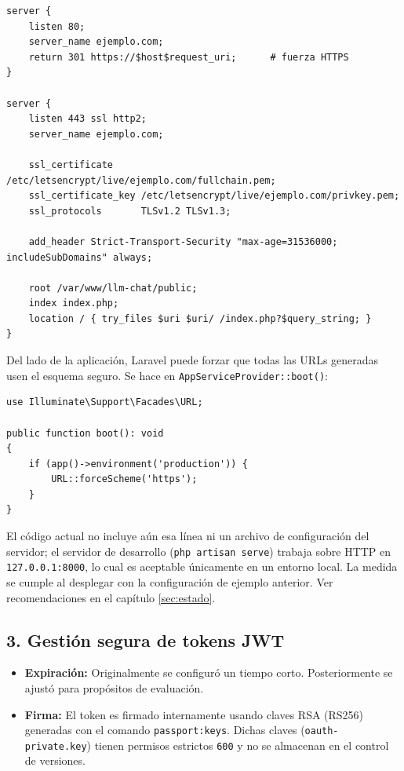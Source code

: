 \begin{lstlisting}[language={}, caption={Ejemplo de configuración Nginx: redirección a HTTPS y HSTS}]
server {
    listen 80;
    server_name ejemplo.com;
    return 301 https://$host$request_uri;      # fuerza HTTPS
}

server {
    listen 443 ssl http2;
    server_name ejemplo.com;

    ssl_certificate     /etc/letsencrypt/live/ejemplo.com/fullchain.pem;
    ssl_certificate_key /etc/letsencrypt/live/ejemplo.com/privkey.pem;
    ssl_protocols       TLSv1.2 TLSv1.3;

    add_header Strict-Transport-Security "max-age=31536000; includeSubDomains" always;

    root /var/www/llm-chat/public;
    index index.php;
    location / { try_files $uri $uri/ /index.php?$query_string; }
}
\end{lstlisting}

Del lado de la aplicación, Laravel puede forzar que todas las URLs generadas usen el esquema seguro. Se hace en \texttt{AppServiceProvider::boot()}:
\begin{lstlisting}[caption={Forzar esquema https en producción (a agregar en AppServiceProvider::boot)}]
use Illuminate\Support\Facades\URL;

public function boot(): void
{
    if (app()->environment('production')) {
        URL::forceScheme('https');
    }
}
\end{lstlisting}

\begin{aviso}
El código actual no incluye aún esa línea ni un archivo de configuración del servidor; el servidor de desarrollo (\texttt{php artisan serve}) trabaja sobre HTTP en \texttt{127.0.0.1:8000}, lo cual es aceptable únicamente en un entorno local. La medida se cumple al desplegar con la configuración de ejemplo anterior. Ver recomendaciones en el capítulo \ref{sec:estado}.
\end{aviso}

\subsection{3. Gestión segura de tokens JWT}
\begin{itemize}
    \item \textbf{Expiración:} Originalmente se configuró un tiempo corto. Posteriormente se ajustó para propósitos de evaluación.
    \item \textbf{Firma:} El token es firmado internamente usando claves RSA (RS256) generadas con el comando \texttt{passport:keys}. Dichas claves (\texttt{oauth-private.key}) tienen permisos estrictos \texttt{600} y no se almacenan en el control de versiones.
\end{itemize}

